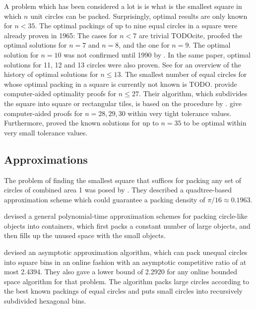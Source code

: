 \documentclass[a4paper,style=print,bibliography=totoc,nexus,lnum,extramargin]{tubsbook}
\begin{document}
A problem which has been considered a lot is is what is the smallest square in which $n$ unit circles can be packed. Surprisingly, optimal results are only known for $n < 35$.
The optimal packings of up to nine equal circles in a square were already proven in 1965: The cases for $n < 7$ are trivial TODOcite,
\textcite{schaer1965densest} proofed the optimal solutions for $n = 7$ and $n = 8$, and \textcite{SM1965geometric} the one for $n = 9$.
The optimal solution for $n = 10$ was not confirmed until 1990 by \textcite{DPW1990optimal}. In the same paper, optimal solutions for 11, 12 and 13 circles were also proven.
See \textcite{WMP1994history} for an overview of the history of optimal solutions for $n \le 13$.
The smallest number of equal circles for whose optimal packing in a square is currently not known is TODO.
\textcite{NO1998more} provide computer-aided optimality proofs for $n \le 27$. Their algorithm, which subdivides the square into square or rectangular tiles, is based on the procedure by \textcite{PWMD1992packing}.
\textcite{MC2005new} give computer-aided proofs for $n=28,29,30$ within very tight tolerance values.
Furthermore, \textcite{LR2002packing} proved the known solutions for up to $n=35$ to be optimal within very small tolerance values.

\subsection{Approximations}

The problem of finding the smallest square that suffices for packing any set of circles of combined area 1 was posed by \textcite{DFL2010circle}. They described a quadtree-based approximation scheme which could guarantee a packing density of $\pi/16 \approx 0.1963$.

\textcite{MPSSW2014polynomial} devised a general polynomial-time approximation schemes for packing circle-like objects into containers, which first packs a constant number of large objects, and then fills up the unused space with the small objects.

\textcite{HMS2016bounded} devised an asymptotic approximation algorithm, which can pack unequal circles into square bins in an online fashion with an asymptotic competitive ratio of at most 2.4394. They also gave a lower bound of 2.2920 for any online bounded space algorithm for that problem. The algorithm packs large circles according to the best known packings of equal circles and puts small circles into recursively subdivided hexagonal bins.
\end{document}
